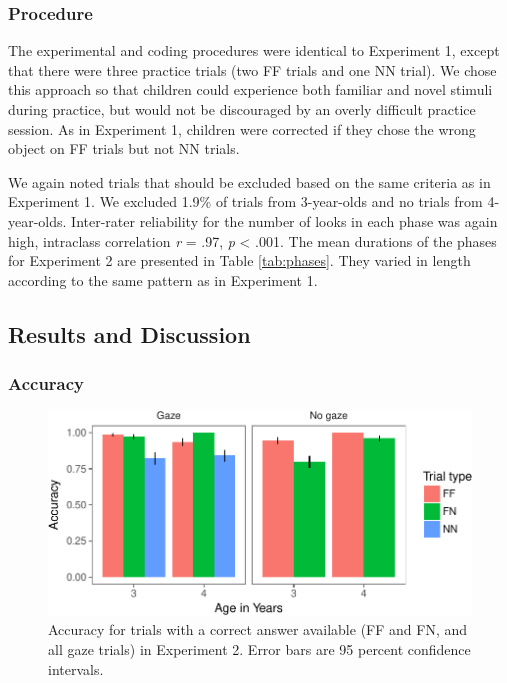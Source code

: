 \documentclass[english,man]{apa6}
\theoremstyle{definition}
\theoremstyle{definition}
\theoremstyle{definition}
\theoremstyle{remark}
\begin{document}
\subsubsection{Procedure}\label{procedure-1}

The experimental and coding procedures were identical to Experiment 1,
except that there were three practice trials (two FF trials and one NN
trial). We chose this approach so that children could experience both
familiar and novel stimuli during practice, but would not be discouraged
by an overly difficult practice session. As in Experiment 1, children
were corrected if they chose the wrong object on FF trials but not NN
trials.

We again noted trials that should be excluded based on the same criteria
as in Experiment 1. We excluded 1.9\% of trials from 3-year-olds and no
trials from 4-year-olds. Inter-rater reliability for the number of looks
in each phase was again high, intraclass correlation \emph{r} = .97,
\emph{p} \textless{} .001. The mean durations of the phases for
Experiment 2 are presented in Table \ref{tab:phases}. They varied in
length according to the same pattern as in Experiment 1.

\subsection{Results and Discussion}\label{results-and-discussion-1}

\subsubsection{Accuracy}\label{accuracy-1}

\begin{figure}
\centering
\includegraphics{figs/acce2-1.pdf}
\caption{\label{fig:acce2}Accuracy for trials with a correct answer
available (FF and FN, and all gaze trials) in Experiment 2. Error bars
are 95 percent confidence intervals.}
\end{figure}
\end{document}
